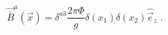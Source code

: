 \begin{equation}
\vec{\bar{B}}^a (\vec{x})=\delta^{a3} 
\frac{2\pi\Phi }{g} \delta(x_1)\delta(x_2)\hat{\vec{e}}_z\;.
\label{G2}
\end{equation}

